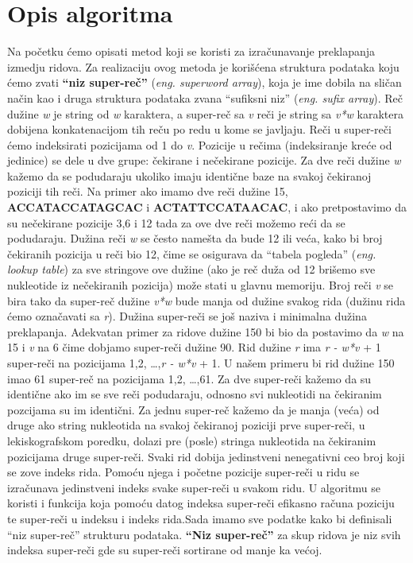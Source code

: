 \documentclass[a4paper]{article}
\begin{document}
{\section{Opis algoritma}
\label{opis_algoritma}
Na početku ćemo opisati metod koji se koristi za izračunavanje preklapanja izmedju ridova. Za realizaciju ovog metoda je korišćena struktura podataka koju ćemo zvati \textbf{``niz super-reč''} (\textit{eng. superword array}), koja je ime dobila na sličan način kao i druga struktura podataka zvana ``sufiksni niz'' (\textit{eng. sufix array}). Reč dužine \textit{w} je string od \textit{w} karaktera, a super-reč sa \textit{v} reči je string sa \textit{v*w} karaktera dobijena konkatenacijom tih reču po redu u kome se javljaju. Reči u super-reči ćemo indeksirati pozicijama od 1 do \textit{v}. Pozicije u rečima (indeksiranje kreće od jedinice) se dele u dve grupe: čekirane i nečekirane pozicije. Za dve reči dužine \textit{w} kažemo da se podudaraju ukoliko imaju identične baze na svakoj čekiranoj poziciji tih reči. Na primer ako imamo dve reči dužine 15, \textbf{ACCATACCATAGCAC} i \textbf{ACTATTCCATAACAC}, i ako pretpostavimo da su nečekirane pozicije 3,6 i 12 tada za ove dve reči možemo reći da se podudaraju. Dužina reči \textit{w} se često namešta da bude 12 ili veća, kako bi broj čekiranih pozicija u reči bio 12, čime se osigurava da ``tabela pogleda'' (\textit{eng. lookup table}) za sve stringove ove dužine (ako je reč duža od 12 brišemo sve nukleotide iz nečekiranih pozicija) može stati u glavnu memoriju. Broj reči \textit{v} se bira tako da super-reč dužine \textit{v*w} bude manja od dužine svakog rida (dužinu rida ćemo označavati sa  \textit{r}). Dužina super-reči se još naziva i minimalna dužina preklapanja. Adekvatan primer za ridove dužine 150 bi bio da postavimo da \textit{w} na 15 i \textit{v} na 6 čime dobjamo super-reči dužine 90. Rid dužine \textit{r} ima \textit{r - w*v }+ 1 super-reči na pozicijama 1,2, \ldots ,\textit{r - w*v }+ 1. U našem primeru bi rid dužine 150 imao 61 super-reč na pozicijama 1,2, \ldots ,61. Za dve super-reči kažemo da su identične ako im se sve reči podudaraju, odnosno svi nukleotidi na čekiranim pozcijama su im identični. Za jednu super-reč kažemo da je manja (veća) od druge ako string nukleotida na svakoj čekiranoj poziciji prve super-reči, u lekiskografskom poredku, dolazi pre (posle) stringa nukleotida na čekiranim pozicijama druge super-reči. Svaki rid dobija jedinstveni nenegativni ceo broj koji se zove indeks rida. Pomoću njega i početne pozicije super-reči u ridu se izračunava jedinstveni indeks svake super-reči u svakom ridu. U algoritmu se koristi i funkcija koja pomoću datog indeksa super-reči efikasno računa poziciju te super-reči u indeksu i indeks rida.Sada imamo sve podatke kako bi definisali ``niz super-reč'' strukturu podataka. \textbf{``Niz super-reč''} za skup ridova je niz svih indeksa super-reči gde su super-reči sortirane od manje ka većoj.

}
\end{document}
